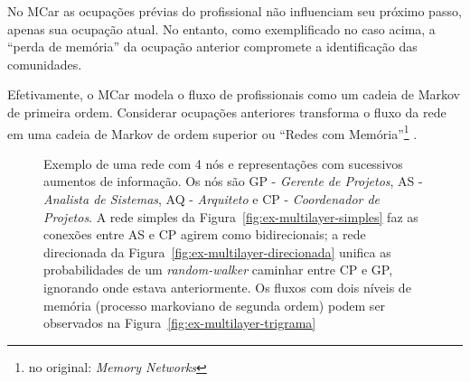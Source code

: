 \documentclass[
  article,
  11pt,
  a4paper,
  english,
  brazil,
  sumario=tradicional]{abntex2}
\begin{document}
No MCar as ocupações prévias do profissional não influenciam seu próximo passo, apenas sua ocupação atual. No entanto, como exemplificado no caso acima, a \enquote{perda de memória} da ocupação anterior compromete a identificação das comunidades.

Efetivamente, o MCar modela o fluxo de profissionais como um cadeia de Markov de primeira ordem. Considerar ocupações anteriores transforma o fluxo da rede em uma cadeia de Markov de ordem superior ou \enquote{Redes com Memória}\footnote{no original: \textit{Memory Networks}} \cite{Edler2017-kt}.

\begin{figure}[htb]
    \centering
    \caption{Exemplo de uma rede com 4 nós e representações com sucessivos aumentos de informação. Os nós são GP - \textit{Gerente de Projetos}, AS - \textit{Analista de Sistemas}, AQ - \textit{Arquiteto} e CP - \textit{Coordenador de Projetos}. A rede simples da Figura~\ref{fig:ex-multilayer-simples} faz as conexões entre AS e CP agirem como bidirecionais; a rede direcionada da Figura~\ref{fig:ex-multilayer-direcionada} unifica as probabilidades de um \textit{random-walker} caminhar entre CP e GP, ignorando onde estava anteriormente. Os fluxos com dois níveis de memória (processo markoviano de segunda ordem) podem ser observados na Figura~\ref{fig:ex-multilayer-trigrama}}
\end{figure}
\end{document}
